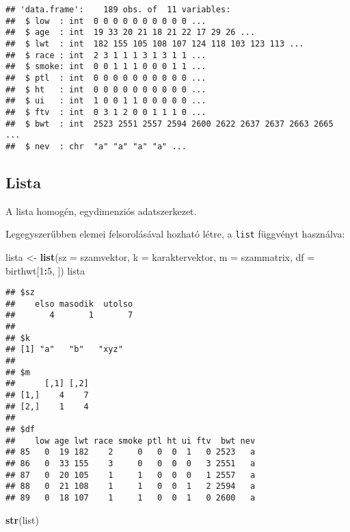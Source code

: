 \documentclass[]{book}
\newenvironment{Shaded}{\begin{snugshade}}{\end{snugshade}}
\newcommand{\KeywordTok}[1]{\textcolor[rgb]{0.13,0.29,0.53}{\textbf{#1}}}
\newcommand{\DataTypeTok}[1]{\textcolor[rgb]{0.13,0.29,0.53}{#1}}
\newcommand{\DecValTok}[1]{\textcolor[rgb]{0.00,0.00,0.81}{#1}}
\newcommand{\StringTok}[1]{\textcolor[rgb]{0.31,0.60,0.02}{#1}}
\newcommand{\OperatorTok}[1]{\textcolor[rgb]{0.81,0.36,0.00}{\textbf{#1}}}
\newcommand{\NormalTok}[1]{#1}
\begin{document}
\begin{verbatim}
## 'data.frame':    189 obs. of  11 variables:
##  $ low  : int  0 0 0 0 0 0 0 0 0 0 ...
##  $ age  : int  19 33 20 21 18 21 22 17 29 26 ...
##  $ lwt  : int  182 155 105 108 107 124 118 103 123 113 ...
##  $ race : int  2 3 1 1 1 3 1 3 1 1 ...
##  $ smoke: int  0 0 1 1 1 0 0 0 1 1 ...
##  $ ptl  : int  0 0 0 0 0 0 0 0 0 0 ...
##  $ ht   : int  0 0 0 0 0 0 0 0 0 0 ...
##  $ ui   : int  1 0 0 1 1 0 0 0 0 0 ...
##  $ ftv  : int  0 3 1 2 0 0 1 1 1 0 ...
##  $ bwt  : int  2523 2551 2557 2594 2600 2622 2637 2637 2663 2665 ...
##  $ nev  : chr  "a" "a" "a" "a" ...
\end{verbatim}

\subsection{Lista}\label{lista}

A lista homogén, egydimenziós adatszerkezet.

Legegyszerűbben elemei felsorolásával hozható létre, a \texttt{list}
függvényt használva:

\begin{Shaded}
\begin{Highlighting}[]
\NormalTok{lista <-}\StringTok{ }\KeywordTok{list}\NormalTok{(}\DataTypeTok{sz =}\NormalTok{ szamvektor, }\DataTypeTok{k =}\NormalTok{ karaktervektor, }\DataTypeTok{m =}\NormalTok{ szammatrix, }\DataTypeTok{df =}\NormalTok{ birthwt[}\DecValTok{1}\OperatorTok{:}\DecValTok{5}\NormalTok{, }
\NormalTok{    ])}
\NormalTok{lista}
\end{Highlighting}
\end{Shaded}

\begin{verbatim}
## $sz
##    elso masodik  utolso 
##       4       1       7 
## 
## $k
## [1] "a"   "b"   "xyz"
## 
## $m
##      [,1] [,2]
## [1,]    4    7
## [2,]    1    4
## 
## $df
##    low age lwt race smoke ptl ht ui ftv  bwt nev
## 85   0  19 182    2     0   0  0  1   0 2523   a
## 86   0  33 155    3     0   0  0  0   3 2551   a
## 87   0  20 105    1     1   0  0  0   1 2557   a
## 88   0  21 108    1     1   0  0  1   2 2594   a
## 89   0  18 107    1     1   0  0  1   0 2600   a
\end{verbatim}

\begin{Shaded}
\begin{Highlighting}[]
\KeywordTok{str}\NormalTok{(list)}
\end{Highlighting}
\end{Shaded}
\end{document}
